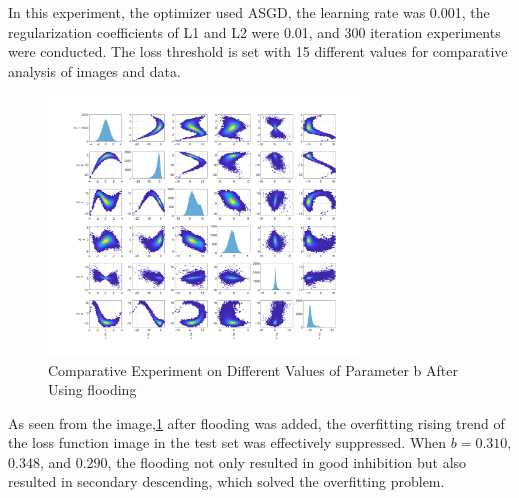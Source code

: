 \documentclass[a4paper,fleqn]{cas-sc}
\begin{document}
In this experiment, the optimizer used ASGD, the learning rate was 0.001, the regularization coefficients of L1 and L2 were 0.01, and 300 iteration experiments were conducted. The loss threshold is set with 15 different values for comparative analysis of images and data.
\begin{figure}
\centering
\includegraphics[width=0.75\textwidth]{figs/f7.png}
\caption{Comparative Experiment on Different Values of Parameter b After Using flooding}
\label{fig:f7}
\end{figure}

As seen from the image,\ref{fig:f7} after flooding was added, the overfitting rising trend of the loss function image in the test set was effectively suppressed. When $b=0.310$, $0.348$, and $0.290$, the flooding not only resulted in good inhibition but also resulted in secondary descending, which solved the overfitting problem.
\end{document}
